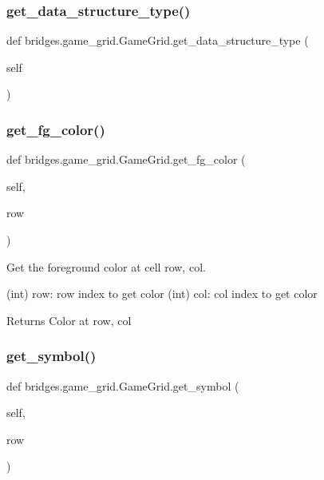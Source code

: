 \subsubsection{\texorpdfstring{get\+\_\+data\+\_\+structure\+\_\+type()}{get\_data\_structure\_type()}}
{\footnotesize\ttfamily def bridges.\+game\+\_\+grid.\+Game\+Grid.\+get\+\_\+data\+\_\+structure\+\_\+type (\begin{DoxyParamCaption}\item[{}]{self }\end{DoxyParamCaption})}

\mbox{\label{classbridges_1_1game__grid_1_1_game_grid_aefb99616dfc0f51601cebf6a420a965f}} 
\subsubsection{\texorpdfstring{get\+\_\+fg\+\_\+color()}{get\_fg\_color()}}
{\footnotesize\ttfamily def bridges.\+game\+\_\+grid.\+Game\+Grid.\+get\+\_\+fg\+\_\+color (\begin{DoxyParamCaption}\item[{}]{self,  }\item[{}]{row }\end{DoxyParamCaption})}



Get the foreground color at cell row, col. 

(int) row\+: row index to get color (int) col\+: col index to get color \begin{DoxyReturn}{Returns}
Color at row, col 
\end{DoxyReturn}
\mbox{\label{classbridges_1_1game__grid_1_1_game_grid_a03818f51e8f99ae68eb7dc6a7f74a4e7}} 
\subsubsection{\texorpdfstring{get\+\_\+symbol()}{get\_symbol()}}
{\footnotesize\ttfamily def bridges.\+game\+\_\+grid.\+Game\+Grid.\+get\+\_\+symbol (\begin{DoxyParamCaption}\item[{}]{self,  }\item[{}]{row }\end{DoxyParamCaption})}



